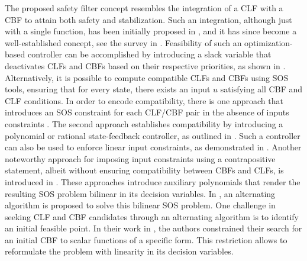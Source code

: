 \documentclass[lettersize,journal]{IEEEtran}
\begin{document}
The proposed safety filter concept resembles the integration of a CLF with a CBF to attain both safety and stabilization.
Such an integration, although just with a single function, has been initially proposed in \cite{RomdlonyJayawardhana:14}, and it has since become a well-established concept, see the survey in \cite{AmesCoogan:19}.
Feasibility of such an optimization-based controller can be accomplished by introducing a slack variable that deactivates CLFs and CBFs based on their respective priorities, as shown in \cite{ames2014control}.
Alternatively, it is possible to compute compatible CLFs and CBFs using SOS tools, ensuring that for every state, there exists an input $u$ satisfying all CBF and CLF conditions.
In order to encode compatibility, there is one approach that introduces an SOS constraint for each CLF/CBF pair in the absence of inputs constraints \cite{Clark:21}.
The second approach establishes compatibility by introducing a polynomial or rational state-feedback controller, as outlined in \cite{WangHan:18,schneeberger2023sos}.
Such a controller can also be used to enforce linear input constraints, as demonstrated in \cite{WangMargellos:22}. 
Another noteworthy approach for imposing input constraints using a contrapositive statement, albeit without ensuring compatibility between CBFs and CLFs, is introduced in \cite{dai2023convex}.
These approaches introduce auxiliary polynomials that render the resulting SOS problem bilinear in its decision variables.
In \cite{TanPackard:04}, an alternating algorithm is proposed to solve this bilinear SOS problem.
One challenge in seeking CLF and CBF candidates through an alternating algorithm is to identify an initial feasible point.
In their work in \cite{zhao2023convex}, the authors constrained their search for an initial CBF to scalar functions of a specific form.
This restriction allows to reformulate the problem with linearity in its decision variables.
\end{document}
